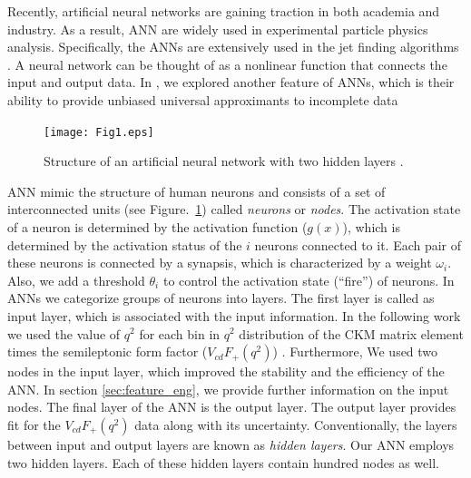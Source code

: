 Recently, artificial neural networks are gaining traction in both academia and industry. As a result, ANN are widely used in experimental particle physics analysis. Specifically, the ANNs are extensively used in the jet finding algorithms \cite{Carleo:2019ptp}. A neural network can be thought of as a nonlinear function that connects the input and output data. In \cite{Grant:2019yar}, we explored another feature of ANNs, which is their ability to provide unbiased universal approximants to incomplete data \cite{NNEstimator,NNEstimator2}
%
\begin{center}
\begin{figure}[H]
\center
\texttt{[image: Fig1.eps]}
\caption{Structure of an artificial neural network with two hidden layers \cite{Grant:2019yar}. \label{Fig:ANN}}
\end{figure}
\end{center}
%
ANN mimic the structure of human neurons and consists of a set of interconnected units (see Figure.~\ref{Fig:ANN}) called {\it neurons} or {\it nodes}\cite{Grant:2019yar}. The activation state of a neuron is determined by the activation function ($g(x)$), which is determined by the activation status of the $i$ neurons connected to it. Each pair of these neurons is connected by a synapsis, which is  characterized by a weight $\omega_i$. Also, we add a threshold $\theta_i$ to control the activation state (``fire'') of neurons. In ANNs we categorize groups of neurons into layers. The first layer is called as input layer, which is associated with the input information. In the following work we used the value of $q^2$ for each bin in $q^2$ distribution of the CKM matrix element times the semileptonic form factor ($V_{cd}F_+(q^2)$) \cite{Grant:2019yar}. Furthermore, We used two nodes in the input layer, which improved the stability and the efficiency of the ANN. In section \ref{sec:feature_eng}, we provide further information on the input nodes. The final layer of the ANN is the output layer. The output layer provides fit for the $V_{cd}F_+(q^2)$ data along with its uncertainty. Conventionally, the layers between input and output layers are known as \textit{hidden layers}. Our ANN employs two hidden layers. Each of these hidden layers contain hundred nodes as well. 

